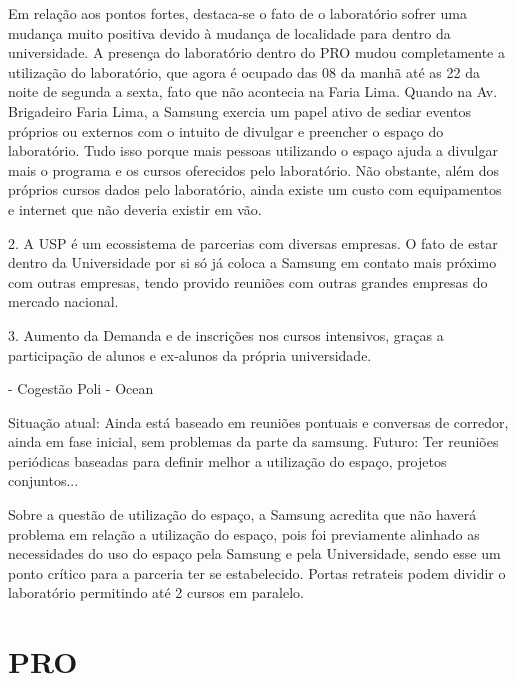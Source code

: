Em relação aos pontos fortes, destaca-se o fato de o laboratório sofrer uma mudança muito positiva devido à mudança de localidade para dentro da universidade. A presença do laboratório dentro do PRO mudou completamente a utilização do laboratório, que agora é ocupado das 08 da manhã até as 22 da noite de segunda a sexta, fato que não acontecia na Faria Lima. Quando na Av. Brigadeiro Faria Lima, a Samsung exercia um papel ativo de sediar eventos próprios ou externos com o intuito de divulgar e preencher o espaço do laboratório. Tudo isso porque mais pessoas utilizando o espaço ajuda a divulgar mais o programa e os cursos oferecidos pelo laboratório. Não obstante, além dos próprios cursos dados pelo laboratório, ainda existe um custo com equipamentos e internet que não deveria existir em vão.

2. A USP é um ecossistema de parcerias com diversas empresas. O fato de estar dentro da Universidade por si só já coloca a Samsung em contato mais próximo com outras empresas, tendo provido reuniões com outras grandes empresas do mercado nacional.

3. Aumento da Demanda e de inscrições nos cursos intensivos, graças a participação de alunos e ex-alunos da própria universidade. 

- Cogestão Poli - Ocean

Situação atual: Ainda está baseado em reuniões pontuais e conversas de corredor, ainda em fase inicial, sem problemas da parte da samsung.
Futuro: Ter reuniões periódicas baseadas para definir melhor a utilização do espaço, projetos conjuntos...

Sobre a questão de utilização do espaço, a Samsung acredita que não haverá problema em relação a utilização do espaço, pois foi previamente alinhado as necessidades do uso do espaço pela Samsung e pela Universidade, sendo esse um ponto crítico para a parceria ter se estabelecido. Portas retrateis podem dividir o laboratório permitindo até 2 cursos em paralelo. 

\section{PRO}

